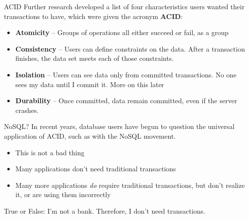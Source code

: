\documentclass[svgnames]{beamer}
\begin{document}
\begin{frame}{ACID}
    Further research developed a list of four characteristics users wanted
    their transactions to have, which were given the acronym \textbf{ACID}:
    \begin{itemize}
        \item \textbf{Atomicity} -- Groups of operations all either succeed or
        fail, as a group
        \item \textbf{Consistency} -- Users can define constraints on the
        data. After a transaction finishes, the data set meets each of those
        constraints.
        \item \textbf{Isolation} -- Users can see data only from committed
        transactions. No one sees my data until I commit it. More on this
        later
        \item \textbf{Durability} -- Once committed, data remain committed,
        even if the server crashes.
    \end{itemize}
\end{frame}


\begin{frame}{NoSQL?}
    In recent years, database users have begun to question the universal
    application of ACID, such as with the NoSQL movement.
    \begin{itemize}
        \item This is not a bad thing
        \item Many applications don't need traditional transactions
        \item Many more applications \textit{do} require traditional
        transactions, but don't realize it, or are using them incorrectly
    \end{itemize}
\end{frame}

\begin{frame}
    True or False: I'm not a bank. Therefore, I don't need transactions.
\end{frame}
\end{document}
